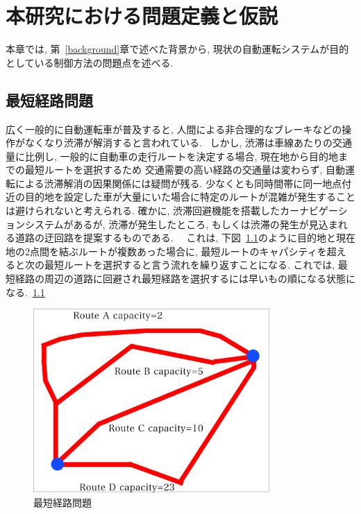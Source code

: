 \chapter{本研究における問題定義と仮説}
\label{issue}

本章では, 第~\ref{background}章で述べた背景から, 現状の自動運転システムが目的としている制御方法の問題点を述べる.

\section{最短経路問題}


広く一般的に自動運転車が普及すると, 人間による非合理的なブレーキなどの操作がなくなり渋滞が解消すると言われている.~\cite{AutomoticTrafficJam}
しかし, 渋滞は車線あたりの交通量に比例し, 一般的に自動車の走行ルートを決定する場合, 現在地から目的地までの最短ルートを選択するため
交通需要の高い経路の交通量は変わらず, 自動運転による渋滞解消の因果関係には疑問が残る.
少なくとも同時間帯に同一地点付近の目的地を設定した車が大量にいた場合に特定のルートが混雑が発生することは避けられないと考えられる.
確かに, 渋滞回避機能を搭載したカーナビゲーションシステムがあるが, 渋滞が発生したところ, もしくは渋滞の発生が見込まれる道路の迂回路を提案するものである.~\cite{NarNavitime}~\cite{YahooNavi}
これは, 下図~\ref{shorten_route_issue}のように目的地と現在地の2点間を結ぶルートが複数あった場合に, 最短ルートのキャパシティを超えると次の最短ルートを選択すると言う流れを繰り返すことになる.
これでは, 最短経路の周辺の道路に回避され最短経路を選択するには早いもの順になる状態になる.~\ref{shorten_route_issue}



\begin{figure}[H]
    \centering  %
    \includegraphics[clip,width = 9.0cm]{assets/Routes.eps}
    \caption{最短経路問題}  \label{shorten_route_issue}
\end{figure}


